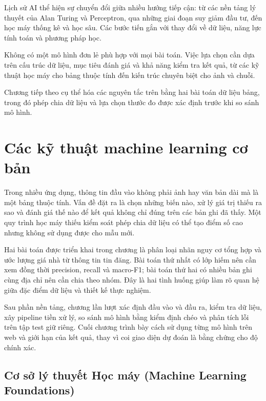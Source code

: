 Lịch sử AI thể hiện sự chuyển đổi giữa nhiều hướng tiếp cận: từ các nền
tảng lý thuyết của Alan Turing và Perceptron, qua những giai đoạn suy
giảm đầu tư, đến học máy thống kê và học sâu. Các bước tiến gắn với thay
đổi về dữ liệu, năng lực tính toán và phương pháp học.

Không có một mô hình đơn lẻ phù hợp với mọi bài toán. Việc lựa chọn cần
dựa trên cấu trúc dữ liệu, mục tiêu đánh giá và khả năng kiểm tra kết
quả, từ các kỹ thuật học máy cho bảng thuộc tính đến kiến trúc chuyên
biệt cho ảnh và chuỗi.

Chương tiếp theo cụ thể hóa các nguyên tắc trên bằng hai bài toán dữ
liệu bảng, trong đó phép chia dữ liệu và lựa chọn thước đo được xác định
trước khi so sánh mô hình.

\chapter{Các kỹ thuật machine learning cơ bản}\label{chux1b0ux1a1ng-2.-cuxe1c-kux1ef9-thuux1eadt-machine-learning-cux1a1-bux1ea3n}

Trong nhiều ứng dụng, thông tin đầu vào không phải ảnh hay văn bản dài
mà là một bảng thuộc tính. Vấn đề đặt ra là chọn những biến nào, xử lý
giá trị thiếu ra sao và đánh giá thế nào để kết quả không chỉ đúng trên
các bản ghi đã thấy. Một quy trình học máy thiếu kiểm soát phép chia dữ
liệu có thể tạo điểm số cao nhưng không sử dụng được cho mẫu mới.

Hai bài toán được triển khai trong chương là phân loại nhãn nguy cơ tổng
hợp và ước lượng giá nhà từ thông tin tin đăng. Bài toán thứ nhất có lớp
hiếm nên cần xem đồng thời precision, recall và macro-F1; bài toán thứ
hai có nhiều bản ghi cùng địa chỉ nên cần chia theo nhóm. Đây là hai
tình huống giúp làm rõ quan hệ giữa đặc điểm dữ liệu và thiết kế thực
nghiệm.

Sau phần nền tảng, chương lần lượt xác định đầu vào và đầu ra, kiểm tra
dữ liệu, xây pipeline tiền xử lý, so sánh mô hình bằng kiểm định chéo và
phân tích lỗi trên tập test giữ riêng. Cuối chương trình bày cách sử
dụng từng mô hình trên web và giới hạn của kết quả, thay vì coi giao
diện dự đoán là bằng chứng cho độ chính xác.

\section{Cơ sở lý thuyết Học máy (Machine Learning Foundations)}\label{cux1a1-sux1edf-luxfd-thuyux1ebft-hux1ecdc-muxe1y-machine-learning-foundations}

